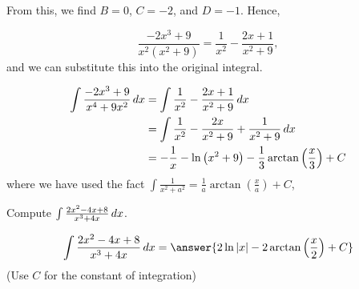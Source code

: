 \documentclass{ximera}
\begin{document}
\begin{exercise}
\begin{example}
\begin{explanation}
From this, we find $B=0$, $C=-2$, and $D=-1$.  Hence,

\[
\frac{-2x^3+9}{x^2(x^2+9)} = \frac{1}{x^2}-\frac{2x+1}{x^2+9},
\]
and we can substitute this into the original integral.

\begin{align*}
\int \frac{-2x^3+9}{x^4+9x^2} \mathop{}\!d x &=  \int \frac{1}{x^2}-\frac{2x+1}{x^2+9} \mathop{}\!d x \\
&=  \int \frac{1}{x^2}-\frac{2x}{x^2+9} +\frac{1}{x^2+9} \mathop{}\!d x \\
&=  -\frac{1}{x}-\ln\left(x^2+9\right) -\frac{1}{3} \arctan\left(\frac{x}{3}\right) +C \\
\end{align*}
where we have used the fact $\int \frac{1}{x^2+a^2} = \frac{1}{a} \arctan\left(\frac{x}{a}\right)+C$, 
\end{explanation}

\end{example}

Compute $\int \frac{2x^2-4x+8}{x^3+4x} \mathop{}\!d x$.

\[
\int \frac{2x^2-4x+8}{x^3+4x} \d x = \answer{2 \ln|x|-2\arctan\left(\frac{x}{2}\right)+C}
\]
(Use $C$ for the constant of integration)
\end{exercise}
\end{document}
